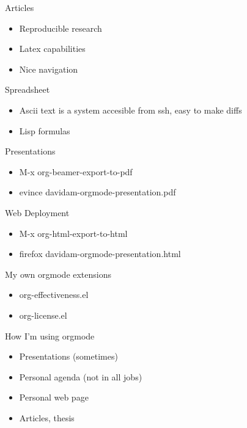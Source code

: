 \documentclass[bigger]{beamer}
\begin{document}
\begin{frame}[label=sec-3]{Articles}
\begin{itemize}
\item Reproducible research
\item Latex capabilities
\item Nice navigation
\end{itemize}
\end{frame}

\begin{frame}[label=sec-4]{Spreadsheet}
\begin{itemize}
\item Ascii text is a system accesible from ssh, easy to make diffs
\item Lisp formulas
\end{itemize}
\end{frame}

\begin{frame}[label=sec-5]{Presentations}
\begin{itemize}
\item M-x org-beamer-export-to-pdf
\item evince davidam-orgmode-presentation.pdf
\end{itemize}
\end{frame}

\begin{frame}[label=sec-6]{Web Deployment}
\begin{itemize}
\item M-x org-html-export-to-html
\item firefox davidam-orgmode-presentation.html
\end{itemize}
\end{frame}

\begin{frame}[label=sec-7]{My own orgmode extensions}
\begin{itemize}
\item org-effectiveness.el
\item org-license.el
\end{itemize}
\end{frame}

\begin{frame}[label=sec-8]{How I'm using orgmode}
\begin{itemize}
\item Presentations (sometimes)
\item Personal agenda (not in all jobs)
\item Personal web page
\item Articles, thesis
\end{itemize}
\end{frame}
\end{document}
